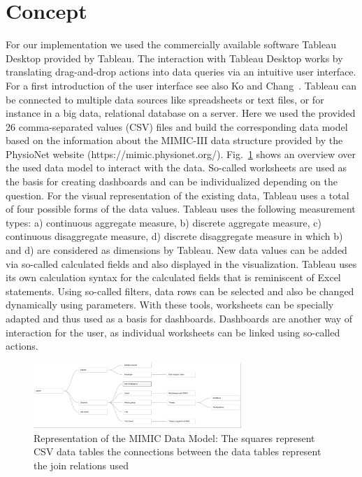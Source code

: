 \documentclass[aac,crcready]{iosart2x}
\begin{document}
\section{Concept}\label{s3}
For our implementation we used the commercially available software Tableau Desktop provided by Tableau\textregistered. The interaction with Tableau Desktop works by translating drag-and-drop actions into data queries via an intuitive user interface. For a first introduction of the user interface see also Ko and Chang~\cite{Ko.2017}. 
Tableau can be connected to multiple data sources like spreadsheets or text files, or for instance in a big data, relational database on a server. Here we used the provided 26 comma-separated values (CSV) files and build the corresponding data model based on the information about the MIMIC-III data structure provided by the PhysioNet website (https://mimic.physionet.org/). Fig.~\ref{f1} shows an overview over the used data model to interact with the data. So-called worksheets are used as the basis for creating dashboards and can be individualized depending on the question. For the visual representation of the existing data, Tableau uses a total of four possible forms of the data values. Tableau uses the following measurement types: a) continuous aggregate measure, b) discrete aggregate measure, c) continuous disaggregate measure, d) discrete disaggregate measure in which b) and d) are considered as dimensions by Tableau.
New data values can be added via so-called calculated fields and also displayed in the visualization. Tableau uses its own calculation syntax for the calculated fields that is reminiscent of Excel statements. Using so-called filters, data rows can be selected and also be changed dynamically using parameters. With these tools, worksheets can be specially adapted and thus used as a basis for dashboards. Dashboards are another way of interaction for the user, as individual worksheets can be linked using so-called actions.

\begin{figure}[t]
\includegraphics[width=0.7\textwidth]{images/datamodel_1.png}
\caption{Representation of the MIMIC Data Model: The squares represent CSV data tables the connections between the data tables represent the join relations used}\label{f1}
\end{figure}
\end{document}

